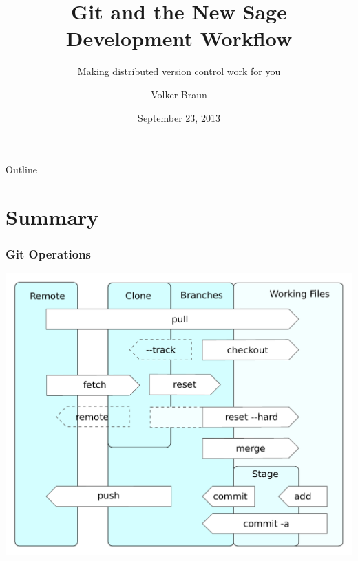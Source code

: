 \documentclass[xcolor=pdftex,t,11pt]{beamer}
\author{Volker Braun}
\title{Git and the New Sage Development Workflow}
\subtitle{Making distributed version control work for you}
\institute{Oxford University}
\date{September 23, 2013}
\begin{document}
\begin{frame}[plain]
	\titlepage
\end{frame}

\begin{frame}{Outline}
	\tableofcontents
\end{frame}







\section{Summary}

\begin{frame}[plain]
  \frametitle{Git Operations}
  \centering
  \includegraphics[width=0.85\linewidth]{images/git_operations}
\end{frame}
\end{document}
